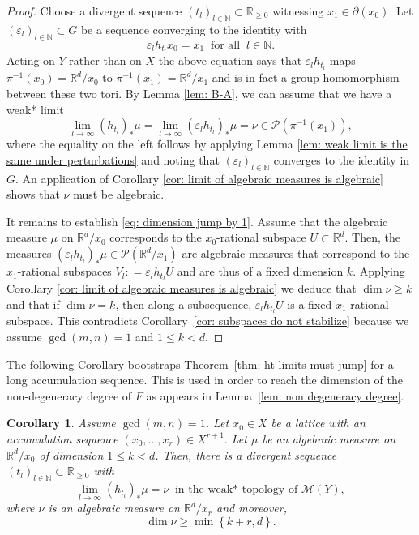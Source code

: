 \documentclass[reqno,11pt, twoside]{amsart}
\theoremstyle{plain}
\newtheorem{cor}[thm]{Corollary}
\theoremstyle{definition}
\theoremstyle{definition}
\theoremstyle{remark}
\numberwithin{equation}{section}
\newcommand{\R}{{\mathbb{R}}}
\newcommand{\N}{{\mathbb{N}}}
\newcommand{\cP}{\mathcal{P}}
\newcommand{\bR}{\mathbb{R}}
\newcommand\seta[1]{\left\{#1\right\}}
\begin{document}
\begin{proof}
    Choose a divergent sequence $(t_l)_{l \in \N} \subset \R_{\geq 0}$ witnessing $x_1 \in \partial(x_0)$. 
    Let $(\varepsilon_l)_{l \in \N} \subset G$ be a sequence converging to the identity with
    \begin{equation*}
        \varepsilon_l h_{t_l} x_0 = x_1 \ \text{ for all }\ l \in \N.
    \end{equation*}
Acting on $Y$ rather than on $X$ the above equation says that $\varepsilon_l h_{t_l}$ maps $\pi^{-1}(x_0) = \bR^d/x_0$ to $\pi^{-1}(x_1)=\bR^d/x_1$ and is in fact a group homomorphism between these two tori.
By Lemma \ref{lem: B-A}, we can assume that we have a weak* limit
\begin{equation}\label{eq: limit exists}
   \lim_{l \to \infty} (h_{t_l})_* \mu= \lim_{l \to \infty} (\varepsilon_lh_{t_l})_* \mu = \nu \in \cP(\pi^{-1}(x_1)),
\end{equation}
where the equality on the left follows by applying Lemma \ref{lem: weak limit is the same under perturbations} and noting that $(\varepsilon_l)_{l \in \N}$ converges to the identity in $G$. An application of  Corollary 
\ref{cor: limit of algebraic measures is algebraic} shows that $\nu$ must be algebraic.

It remains to establish \eqref{eq: dimension jump by 1}. Assume that the algebraic measure $\mu$ on $\R^d/x_0$ corresponds to the $x_0$-rational subspace $U \subset \R^d$.
Then, the measures $(\varepsilon_lh_{t_l})_*\mu\in \cP(\bR^d/x_1)$ are algebraic measures that correspond to the $x_1$-rational subspaces $V_l: =\varepsilon_lh_{t_l}U$ and are thus of a fixed dimension $k$. Applying 
Corollary \ref{cor: limit of algebraic measures is algebraic} we deduce that 
$\dim \nu\ge k$ and that if $\dim \nu = k$, then along a subsequence, $\varepsilon_lh_{t_l}U$ is a fixed $x_1$-rational subspace. 
This contradicts Corollary~\ref{cor: subspaces do not stabilize} because we assume $\gcd(m,n)=1$ and $1\le k<d$.
\end{proof}
The following Corollary bootstraps Theorem~\ref{thm: ht limits must jump}
for a long accumulation sequence. This is used in order to reach the dimension of the non-degeneracy degree of $F$ as appears in Lemma~\ref{lem: non degeneracy degree}.
\begin{cor}\label{cor: acc seq measure dimension}
   Assume $\gcd(m,n) =1$. Let $x_0 \in X$ be a lattice with an accumulation sequence 
$        (x_0, \dots, x_r) \in X^{r+1}.$
    Let $\mu$ be an algebraic measure on $\bR^d/x_0$ of dimension $1\le k<d$.
    Then, there is a divergent sequence $(t_l)_{l \in \N} \subset \R_{\geq 0}$ with
    \begin{equation*}
        \lim_{l \to \infty} (h_{t_l})_* \mu = \nu \ \text{ in the weak* topology of } \mathcal{M}(Y),
    \end{equation*}
    where $\nu$ is an algebraic measure on $\bR^d/x_r$ and moreover, 
    \begin{equation}\label{eq: dimension jump by more}
        \dim \nu \geq \min\seta{k+r, d}.
    \end{equation}
\end{cor}
\end{document}
